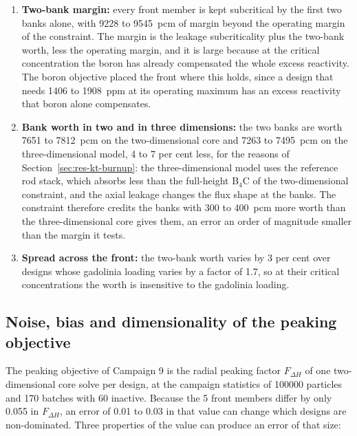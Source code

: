 \begin{enumerate}
  \item \textbf{Two-bank margin:} every front member is kept
        subcritical by the first two banks alone, with 9228 to
        \SI{9545}{pcm} of margin beyond the operating margin of the
        constraint. The margin is the leakage subcriticality plus the
        two-bank worth, less the operating margin, and it is large because
        at the critical concentration the boron has already compensated
        the whole excess reactivity. The boron objective placed the
        front where this holds, since a design that needs 1406 to
        \SI{1908}{ppm} at its operating maximum has an excess reactivity
        that boron alone compensates.

  \item \textbf{Bank worth in two and in three dimensions:} the two
        banks are worth 7651 to \SI{7812}{pcm} on the two-dimensional
        core and 7263 to \SI{7495}{pcm} on the three-dimensional model,
        4 to 7 per cent less, for the reasons of
        Section~\ref{sec:res-kt-burnup}: the three-dimensional model
        uses the reference rod stack, which absorbs less than the
        full-height B$_4$C of the two-dimensional constraint, and the
        axial leakage changes the flux shape at the banks. The constraint
        therefore credits the banks with 300 to \SI{400}{pcm} more
        worth than the three-dimensional core gives them, an error an
        order of magnitude smaller than the margin it tests.

  \item \textbf{Spread across the front:} the two-bank worth varies by
        3 per cent over designs whose gadolinia loading varies by a
        factor of 1.7, so at their critical concentrations the worth is
        insensitive to the gadolinia loading.
\end{enumerate}

\subsection{Noise, bias and dimensionality of the peaking objective}
\label{sec:res-c9-peaking}

The peaking objective of Campaign 9 is the radial peaking factor
$F_{\Delta H}$ of one two-dimensional core solve per design, at the
campaign statistics of \num{100000} particles and 170 batches with 60
inactive. Because the 5 front members differ by only 0.055 in
$F_{\Delta H}$, an error of 0.01 to 0.03 in that value can change which
designs are non-dominated. Three properties of the value can produce an
error of that size:

